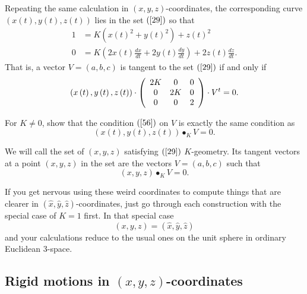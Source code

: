 \documentclass{ximera}
\begin{document}
Repeating the same calculation in $\left(  x,y,z\right)  $-coordinates, the
corresponding curve $\left(  x\left(  t\right)  ,y\left(  t\right)  ,z\left(
t\right)  \right)  $ lies in the set $\left(  \ref{29}\right)  $ so that%
\begin{align*}
1  &  =K\left(  x\left(  t\right)  ^{2}+y\left(  t\right)  ^{2}\right)
+z\left(  t\right)  ^{2}\\
0  &  =K\left(  2x\left(  t\right)  \frac{dx}{dt}+2y\left(  t\right)
\frac{dy}{dt}\right)  +2z\left(  t\right)  \frac{dz}{dt}.
\end{align*}
That is, a vector $V=\left(  a,b,c\right)  $ is tangent to the set $\left(
\ref{29}\right)  $ if and only if%
\begin{equation}
\left(  x\left(  t\right)  ,y\left(  t\right)  ,z\left(  t\right)  \right)
\cdot\left(
\begin{array}
[c]{ccc}%
2K & 0 & 0\\
0 & 2K & 0\\
0 & 0 & 2
\end{array}
\right)  \cdot V^{t}=0. \label{56}%
\end{equation}


\begin{exercise}
\label{82}For $K\neq0$, show that the condition $\left(  \ref{56}\right)  $ on
$V$ is exactly the same condition as%
\[
\left(  x\left(  t\right)  ,y\left(  t\right)  ,z\left(  t\right)  \right)
\bullet_{K}V=0.
\]

\end{exercise}

We will call the set of $\left(  x,y,z\right)  $ satisfying $\left(
\ref{29}\right)  $ $K$-geometry. Its tangent vectors at a point $\left(
x,y,z\right)  $ in the set are the vectors $V=\left(  a,b,c\right)  $ such
that%
\[
\left(  x,y,z\right)  \bullet_{K}V=0.
\]


If you get nervous using these weird coordinates to compute things
that are clearer in $\left( \hat{x},\hat{y},\hat{z}\right)
$-coordinates, just go through each construction with the special case
of $K=1$ first.  In that special case
\[
\left(  x,y,z\right)  =\left(  \hat{x},\hat{y},\hat{z}\right)
\]
and your calculations reduce to the usual ones on the unit sphere in ordinary
Euclidean $3$-space.

\subsection*{Rigid motions in $\left(  x,y,z\right)  $-coordinates}
\end{document}
